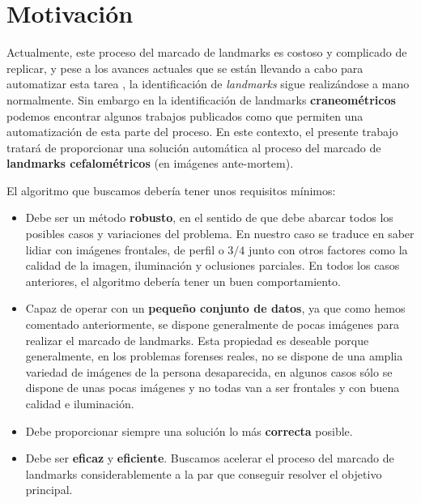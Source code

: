 \medskip 


\section{Motivación}

Actualmente, este proceso del marcado de landmarks es costoso y complicado de replicar, y pese a los avances actuales que se están llevando a cabo para automatizar esta tarea \cite{Huete2015PastPA}, la identificación de \textit{landmarks} sigue realizándose a mano normalmente. Sin embargo en la identificación de landmarks \textbf{craneométricos} podemos encontrar algunos trabajos publicados como \cite{bermejo2021automatic} que permiten una automatización de esta parte del proceso. En este contexto, el presente trabajo tratará de proporcionar una solución automática al proceso del marcado de \textbf{landmarks cefalométricos} (en imágenes ante-mortem).

\medskip

\noindent El algoritmo que buscamos debería tener unos requisitos mínimos: 

\begin{itemize}
    \item Debe ser un método \textbf{robusto}, en el sentido de que debe abarcar todos los posibles casos y variaciones del problema. En nuestro caso se traduce en saber lidiar con imágenes frontales, de perfil o $3/4$ junto con otros factores como la calidad de la imagen, iluminación y oclusiones parciales. En todos los casos anteriores, el algoritmo debería tener un buen comportamiento.
    \item Capaz de operar con un \textbf{pequeño conjunto de datos}, ya que como hemos comentado anteriormente, se dispone generalmente de pocas imágenes para realizar el marcado de landmarks. Esta propiedad es deseable porque generalmente, en los problemas forenses reales, no se dispone de una amplia variedad de imágenes de la persona desaparecida, en algunos casos sólo se dispone de unas pocas imágenes y no todas van a ser frontales y con buena calidad e iluminación.

    \item Debe proporcionar siempre una solución lo más \textbf{correcta} posible.  
    
    \item Debe ser \textbf{eficaz} y \textbf{eficiente}. Buscamos acelerar el proceso del marcado de landmarks considerablemente a la par que conseguir resolver el objetivo principal.
\end{itemize}

